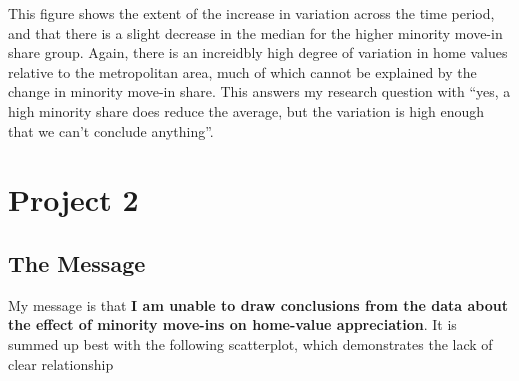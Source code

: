 \documentclass[11pt]{article}
\begin{document}
    This figure shows the extent of the increase in variation across the
time period, and that there is a slight decrease in the median for the
higher minority move-in share group. Again, there is an increidbly high
degree of variation in home values relative to the metropolitan area,
much of which cannot be explained by the change in minority move-in
share. This answers my research question with ``yes, a high minority
share does reduce the average, but the variation is high enough that we
can't conclude anything''.

    \section{Project 2}\label{part-two}

    \subsection{The Message}\label{the-message}

    My message is that \textbf{I am unable to draw conclusions from the data
about the effect of minority move-ins on home-value appreciation}. It is
summed up best with the following scatterplot, which demonstrates the
lack of clear relationship
\end{document}
